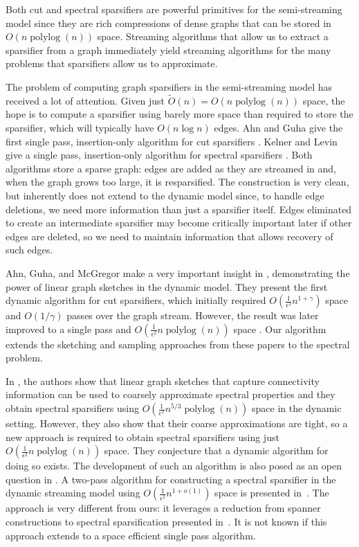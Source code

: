 \documentclass[11pt]{article}
\newcommand{\plog}{\mathop\mathrm{polylog}}
\begin{document}
\if Both cut and spectral sparsifiers are powerful primitives for the semi-streaming model since they are rich compressions of dense graphs that can be stored in $O(n\plog (n))$ space. Streaming algorithms that allow us to extract a sparsifier from a graph immediately yield streaming algorithms for the many problems that sparsifiers allow us to approximate. 
\fi

The problem of computing graph sparsifiers in the semi-streaming model has received a lot of attention. Given just $\tilde{O}(n) = O(n \plog(n))$ space, the hope is to compute a sparsifier using barely more space than required to store the sparsifier, which will typically have $O(n\log n)$ edges.  Ahn and Guha give the first single pass, insertion-only algorithm for cut sparsifiers \cite{ahnStreamingSparsification}. Kelner and Levin give a single pass, insertion-only algorithm for spectral sparsifiers \cite{kelner2011spectral}. Both algorithms store a sparse graph: edges are added as they are streamed in and, when the graph grows too large, it is resparsified. The construction is very clean, but inherently does not extend to the dynamic model since, to handle edge deletions, we need more information than just a sparsifier itself. Edges eliminated to create an intermediate sparsifier may become critically important later if other edges are deleted, so we need to maintain information that allows recovery of such edges.

Ahn, Guha, and McGregor make a very important insight in \cite{linearMeasurement}, demonstrating the power of linear graph sketches in the dynamic model. They present the first dynamic algorithm for cut sparsifiers, which initially required $O(\frac{1}{\epsilon^2} n^{1+\gamma})$ space and $O(1/\gamma)$ passes over the graph stream. However, the result was later improved to a single pass and $O(\frac{1}{\epsilon^2}n\plog (n))$ space \cite{gssss,goel2012single}. Our algorithm extends the sketching and sampling approaches from these papers to the spectral problem.

In \cite{ahn2013spectral}, the authors show that linear graph sketches that capture connectivity information can be used to coarsely approximate spectral properties and they obtain spectral sparsifiers using $O(\frac{1}{\epsilon^2}n^{5/3} \plog(n))$ space in the dynamic setting. However, they also show that their coarse approximations are tight, so a new approach is required to obtain spectral sparsifiers using just $O(\frac{1}{\epsilon^2}n\plog (n))$ space. They conjecture that a dynamic algorithm for doing so exists. The development of such an algorithm is also posed as an open question in \cite{gregorSurvey}. A two-pass algorithm for constructing a spectral sparsifier in the dynamic streaming model using $O \left (\frac1{\epsilon^2}n^{1+o(1)} \right)$ space is presented in~\cite{KW14}. The approach is very different from ours: it leverages a reduction from spanner constructions to spectral sparsification presented in~\cite{KP12}. It is not known if this approach extends to a space efficient single pass algorithm.
\end{document}
